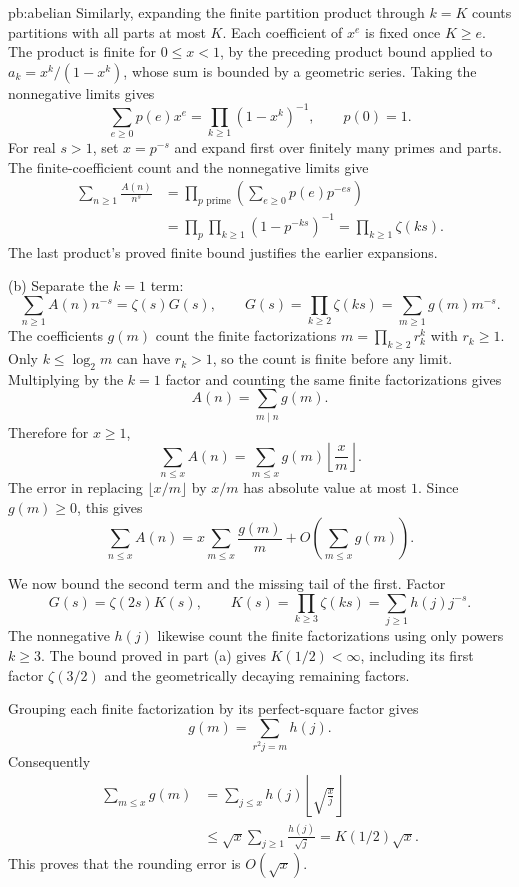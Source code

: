 \begin{solution}{pb:abelian}
Similarly, expanding the finite partition product through $k=K$ counts
partitions with all parts at most $K$. Each coefficient of $x^e$ is fixed
once $K\ge e$. The product is finite for $0\le x<1$, by the preceding
product bound applied to $a_k=x^k/(1-x^k)$, whose sum is bounded by a
geometric series. Taking the nonnegative limits gives
\[
\sum_{e\ge0}p(e)x^e=\prod_{k\ge1}(1-x^k)^{-1},\qquad p(0)=1.
\]
For real $s>1$, set $x=p^{-s}$ and expand first over finitely many primes
and parts. The finite-coefficient count and the nonnegative limits give
\[
\begin{aligned}
\sum_{n\ge1}\frac{A(n)}{n^s}
&=\prod_{p\text{ prime}}\left(\sum_{e\ge0}p(e)p^{-es}\right)\\
&=\prod_p\prod_{k\ge1}(1-p^{-ks})^{-1}
=\boxed{\prod_{k\ge1}\zeta(ks)}.
\end{aligned}
\]
The last product's proved finite bound justifies the earlier expansions.


(b) Separate the $k=1$ term:
\[
\sum_{n\ge1}A(n)n^{-s}
=\zeta(s)G(s),\qquad
G(s)=\prod_{k\ge2}\zeta(ks)
=\sum_{m\ge1}g(m)m^{-s}.
\]
The coefficients $g(m)$ count the finite factorizations $m=\prod_{k\ge2}r_k^k$ with $r_k\ge1$. Only $k\le\log_2m$ can have $r_k>1$, so the count is finite before any limit. Multiplying by the $k=1$ factor and counting the same finite factorizations gives
\[
A(n)=\sum_{m\mid n}g(m).
\]
Therefore for $x\ge1$,
\[
\sum_{n\le x}A(n)
=\sum_{m\le x}g(m)\left\lfloor\frac xm\right\rfloor.
\]
The error in replacing $\lfloor x/m\rfloor$ by $x/m$ has absolute value at most $1$. Since $g(m)\ge0$, this gives
\[
\sum_{n\le x}A(n)
=x\sum_{m\le x}\frac{g(m)}m
+O\!\left(\sum_{m\le x}g(m)\right).
\]

We now bound the second term and the missing tail of the first. Factor
\[
G(s)=\zeta(2s)K(s),\qquad
K(s)=\prod_{k\ge3}\zeta(ks)=\sum_{j\ge1}h(j)j^{-s}.
\]
The nonnegative $h(j)$ likewise count the finite factorizations using only powers $k\ge3$. The bound proved in part (a) gives $K(1/2)<\infty$, including its first factor $\zeta(3/2)$ and the geometrically decaying remaining factors.

Grouping each finite factorization by its perfect-square factor gives
\[
g(m)=\sum_{r^2j=m}h(j).
\]
Consequently
\[
\begin{aligned}
\sum_{m\le x}g(m)
&=\sum_{j\le x}h(j)\left\lfloor\sqrt{\frac xj}\right\rfloor\\
&\le\sqrt x\sum_{j\ge1}\frac{h(j)}{\sqrt j}
=K(1/2)\sqrt x.
\end{aligned}
\]
This proves that the rounding error is $O(\sqrt x)$.


\end{solution}
